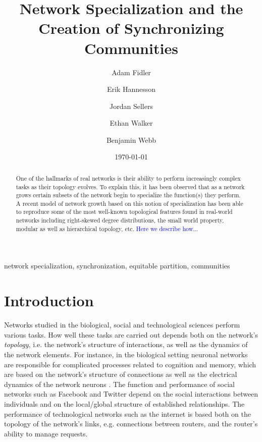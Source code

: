 \documentclass[10pt]{elsarticle}
\theoremstyle{remark}
\begin{document}
\begin{frontmatter}

\date{\today}

\title{Network Specialization and the Creation of Synchronizing Communities}

\author[adam]{Adam Fidler}
\address[adam]{Department of Mathematics, Brigham Young University, Provo, UT 84602, USA, adam.fidler1@gmail.com }
\author[erik]{Erik Hannesson}
\address[erik]{Department of Mathematics, Brigham Young University, Provo, UT 84602, USA, erikhannesson@gmail.com}
\author[jordan]{Jordan Sellers}
\address[jordan]{Department of Mathematics, Brigham Young University, Provo, UT 84602, USA, jordansellers451@gmail.com }
\author[ethan]{Ethan Walker}
\address[ethan]{Department of Mathematics, Brigham Young University, Provo, UT 84602, USA, ethan.walker830@gmail.com}
\author[ben]{Benjamin Webb}
\address[ben]{Department of Mathematics, Brigham Young University, Provo, UT 84602, USA, bwebb@mathematics.byu.edu}

\begin{abstract}
One of the hallmarks of real networks is their ability to perform increasingly complex tasks as their topology evolves. To explain this, it has been observed that as a network grows certain subsets of the network begin to specialize the function(s) they perform. A recent model of network growth based on this notion of specialization has been able to reproduce some of the most well-known topological features found in real-world networks including right-skewed degree distributions, the small world property, modular as well as hierarchical topology, etc. \textcolor{blue}{Here we describe how...}
\end{abstract}

\begin{keyword}
network specialization, synchronization, equitable partition, communities
\end{keyword}

\end{frontmatter}

\section{Introduction}
Networks studied in the biological, social and technological sciences perform various tasks. How well these tasks are carried out depends both on the network's \emph{topology}, i.e. the network's structure of interactions, as well as the dynamics of the network elements. For instance, in the biological setting neuronal networks are responsible for complicated processes related to cognition and memory, which are based on the network's structure of connections as well as the electrical dynamics of the network neurons \cite{BS09}. The function and performance of social networks such as Facebook and Twitter depend on the social interactions between individuals and on the local/global structure of established relationships. The performance of technological networks such as the internet is based both on the topology of the network's links, e.g. connections between routers, and the router's ability to manage requests.
\end{document}
